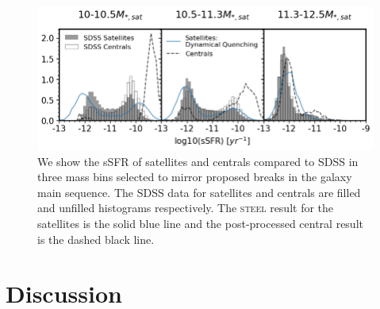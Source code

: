 \begin{figure}[h]
    \centering
    \includegraphics[width = \linewidth]{Figures/Chapter4/SSFR.png}
    \caption{We show the sSFR of satellites and centrals compared to SDSS in three mass bins selected to mirror proposed breaks in the galaxy main sequence. The SDSS data for satellites and centrals are filled and unfilled histograms respectively. The \textsc{steel} result for the satellites is the solid blue line and the post-processed central result is the dashed black line.}
    \label{fig:sSFR}
\end{figure}

\section{Discussion}

